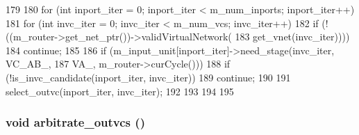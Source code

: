 \begin{DoxyCode}
179 {
180     for (int inport_iter = 0; inport_iter < m_num_inports; inport_iter++) {
181         for (int invc_iter = 0; invc_iter < m_num_vcs; invc_iter++) {
182             if (!((m_router->get_net_ptr())->validVirtualNetwork(
183                 get_vnet(invc_iter))))
184                 continue;
185 
186             if (m_input_unit[inport_iter]->need_stage(invc_iter, VC_AB_,
187                     VA_, m_router->curCycle())) {
188                 if (!is_invc_candidate(inport_iter, invc_iter))
189                     continue;
190 
191                 select_outvc(inport_iter, invc_iter);
192             }
193         }
194     }
195 }
\end{DoxyCode}
\hypertarget{classVCallocator__d_afe82cf170836278a70414a8f02ce6980}{
\subsubsection[{arbitrate\_\-outvcs}]{\setlength{\rightskip}{0pt plus 5cm}void arbitrate\_\-outvcs ()}}
\label{classVCallocator__d_afe82cf170836278a70414a8f02ce6980}



